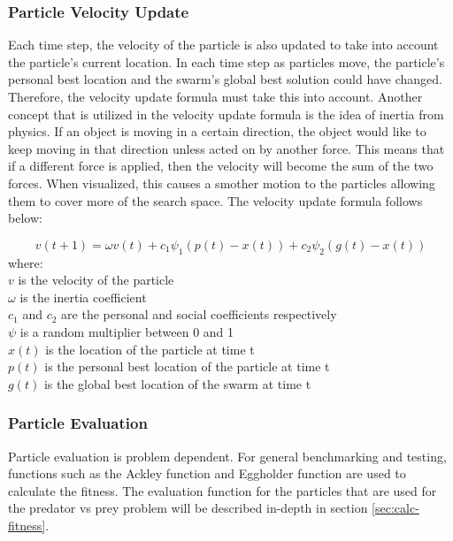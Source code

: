 \subsubsection{Particle Velocity Update}
Each time step, the velocity of the particle is also updated to take into account the particle's current location. In each time step as particles move, the particle's personal best location and the swarm's global best solution could have changed. Therefore, the velocity update formula must take this into account. Another concept that is utilized in the velocity update formula is the idea of inertia from physics. If an object is moving in a certain direction, the object would like to keep moving in that direction unless acted on by another force. This means that if a different force is applied, then the velocity will become the sum of the two forces. When visualized, this causes a smother motion to the particles allowing them to cover more of the search space. The velocity update formula follows below:

\begin{equation} \label{eqn:vel-update-formula}
  v(t+1) = \omega v(t) + c_1 \psi_1  (p(t) - x(t)) + c_2 \psi_2  (g(t) - x(t)) 
\end{equation}
where:\\
\indent $v$ is the velocity of the particle\\
\indent $\omega$ is the inertia coefficient\\
\indent $c_1$ and $c_2$ are the personal and social coefficients respectively\\
\indent $\psi$ is a random multiplier between 0 and 1\\
\indent $x(t)$ is the location of the particle at time t\\
\indent $p(t)$ is the personal best location of the particle at time t\\
\indent $g(t)$ is the global best location of the swarm at time t




\subsubsection{Particle Evaluation}
Particle evaluation is problem dependent. For general benchmarking and testing, functions such as the Ackley function and Eggholder function are used to calculate the fitness. The evaluation function for the particles that are used for the predator vs prey problem will be described in-depth in section \ref{sec:calc-fitness}.

